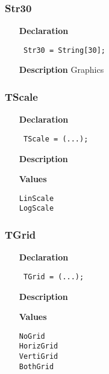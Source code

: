 \documentclass[12pt,a4paper,oneside]{report}
\newcommand{\declarationitem}[1]{\textbf{#1}}
\newcommand{\descriptiontitle}[1]{\textbf{#1}}
\newcommand{\code}[1]{\texttt{#1}}
\begin{document}
\subsubsection{Str30}
\label{utypes-Str30}
\begin{itemize}\item[\declarationitem{Declaration}\hfill]
	\begin{flushleft}
		\code{
			Str30  = String[30];}
	\end{flushleft}
	\item[\descriptiontitle{Description}]
	 Graphics	
\end{itemize}
\subsubsection{TScale}
\label{utypes-TScale}
\begin{itemize}\item[\declarationitem{Declaration}\hfill]
	\begin{flushleft}
		\code{
			TScale = (...);}
	\end{flushleft}
	\item[\descriptiontitle{Description}]
	\item[\textbf{Values}]
	\begin{description}
		\item[\texttt{LinScale}]  
		\item[\texttt{LogScale}]  
	\end{description}
\end{itemize}

\subsubsection{TGrid}
\label{utypes-TGrid}
\begin{itemize}\item[\declarationitem{Declaration}\hfill]
	\begin{flushleft}
		\code{
			TGrid = (...);}
	\end{flushleft}
	\item[\descriptiontitle{Description}]
	\item[\textbf{Values}]
	\begin{description}
		\item[\texttt{NoGrid}]  
		\item[\texttt{HorizGrid}]  
		\item[\texttt{VertiGrid}]  
		\item[\texttt{BothGrid}]  
	\end{description}
\end{itemize}
\end{document}
